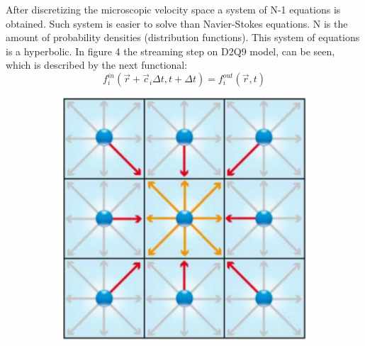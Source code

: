 After discretizing the microscopic velocity space a system of N-1 equations is obtained. Such system is easier to solve than Navier-Stokes equations. N is the amount of probability densities (distribution functions). This system of equations is a hyperbolic. In figure 4 the streaming step on D2Q9 model, can be seen, which is described by the next functional:
\begin{equation}
f_i^{in}(\vec{r}+\vec{c}_{i}\Delta t, t+\Delta t) = f_i^{out}(\vec{r}, t)
\end{equation}

\begin{figure}[H]
  \centering
  \begin{subfigure}[h]{0.3\textwidth}
    \includegraphics[width=\textwidth]{img/fig7-1.png}
  \end{subfigure}
  \begin{subfigure}[h]{0.3\textwidth}

\end{subfigure}
\end{figure}
